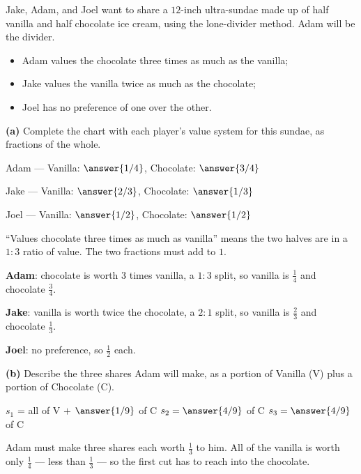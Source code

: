 \documentclass[12pt]{ximera}
\begin{document}
\begin{problem}
Jake, Adam, and Joel want to share a $12$-inch ultra-sundae made up of half vanilla and
half chocolate ice cream, using the lone-divider method. Adam will be the divider.
\begin{itemize}
\item Adam values the chocolate three times as much as the vanilla;
\item Jake values the vanilla twice as much as the chocolate;
\item Joel has no preference of one over the other.
\end{itemize}

\begin{prompt}
\textbf{(a)} Complete the chart with each player's value system for this sundae, as
fractions of the whole.

Adam --- Vanilla: $\answer{1/4}$, \quad Chocolate: $\answer{3/4}$

\smallskip
Jake --- Vanilla: $\answer{2/3}$, \quad Chocolate: $\answer{1/3}$

\smallskip
Joel --- Vanilla: $\answer{1/2}$, \quad Chocolate: $\answer{1/2}$

\begin{hint}
``Values chocolate three times as much as vanilla'' means the two halves are in a
$1:3$ ratio of value. The two fractions must add to $1$.
\end{hint}

\begin{solution}
\textbf{Adam}: chocolate is worth $3$ times vanilla, a $1:3$ split, so vanilla is
$\frac14$ and chocolate $\frac34$.

\textbf{Jake}: vanilla is worth twice the chocolate, a $2:1$ split, so vanilla is
$\frac23$ and chocolate $\frac13$.

\textbf{Joel}: no preference, so $\frac12$ each.
\end{solution}
\end{prompt}

\begin{prompt}
\textbf{(b)} Describe the three shares Adam will make, as a portion of Vanilla (V) plus
a portion of Chocolate (C).

$s_1$ = all of V $+$ $\answer{1/9}$ of C \qquad
$s_2 = \answer{4/9}$ of C \qquad
$s_3 = \answer{4/9}$ of C

\begin{hint}
Adam must make three shares each worth $\frac13$ to him. All of the vanilla is worth
only $\frac14$ --- less than $\frac13$ --- so the first cut has to reach into the
chocolate.
\end{hint}


\end{prompt}
\end{problem}
\end{document}
